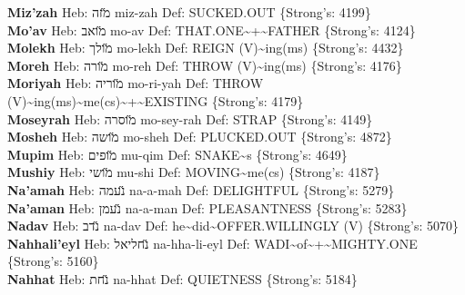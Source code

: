 {\textbf{Miz'zah} Heb: {\large\H מזה} miz-zah Def: SUCKED.OUT \{Strong's: 4199\}\hfill{}\\

\textbf{Mo'av} Heb: {\large\H מואב} mo-av Def: THAT.ONE\textasciitilde{}+\textasciitilde{}FATHER \{Strong's: 4124\}\hfill{}\\

\textbf{Molekh} Heb: {\large\H מולך} mo-lekh Def: REIGN (V)\textasciitilde{}ing(ms) \{Strong's: 4432\}\hfill{}\\

\textbf{Moreh} Heb: {\large\H מורה} mo-reh Def: THROW (V)\textasciitilde{}ing(ms) \{Strong's: 4176\}\hfill{}\\

\textbf{Moriyah} Heb: {\large\H מוריה} mo-ri-yah Def: THROW (V)\textasciitilde{}ing(ms)\textasciitilde{}me(cs)\textasciitilde{}+\textasciitilde{}EXISTING \{Strong's: 4179\}\hfill{}\\

\textbf{Moseyrah} Heb: {\large\H מוסרה} mo-sey-rah Def: STRAP \{Strong's: 4149\}\hfill{}\\

\textbf{Mosheh} Heb: {\large\H מושה} mo-sheh Def: PLUCKED.OUT \{Strong's: 4872\}\hfill{}\\

\textbf{Mupim} Heb: {\large\H מופים} mu-qim Def: SNAKE\textasciitilde{}s \{Strong's: 4649\}\hfill{}\\

\textbf{Mushiy} Heb: {\large\H מושי} mu-shi Def: MOVING\textasciitilde{}me(cs) \{Strong's: 4187\}\hfill{}\\

\textbf{Na'amah} Heb: {\large\H נעמה} na-a-mah Def: DELIGHTFUL \{Strong's: 5279\}\hfill{}\\

\textbf{Na'aman} Heb: {\large\H נעמן} na-a-man Def: PLEASANTNESS \{Strong's: 5283\}\hfill{}\\

\textbf{Nadav} Heb: {\large\H נדב} na-dav Def: he\textasciitilde{}did\textasciitilde{}OFFER.WILLINGLY (V) \{Strong's: 5070\}\hfill{}\\

\textbf{Nahhali'eyl} Heb: {\large\H נחליאל} na-hha-li-eyl Def: WADI\textasciitilde{}of\textasciitilde{}+\textasciitilde{}MIGHTY.ONE \{Strong's: 5160\}\hfill{}\\

\textbf{Nahhat} Heb: {\large\H נחת} na-hhat Def: QUIETNESS \{Strong's: 5184\}\hfill{}\\

}
